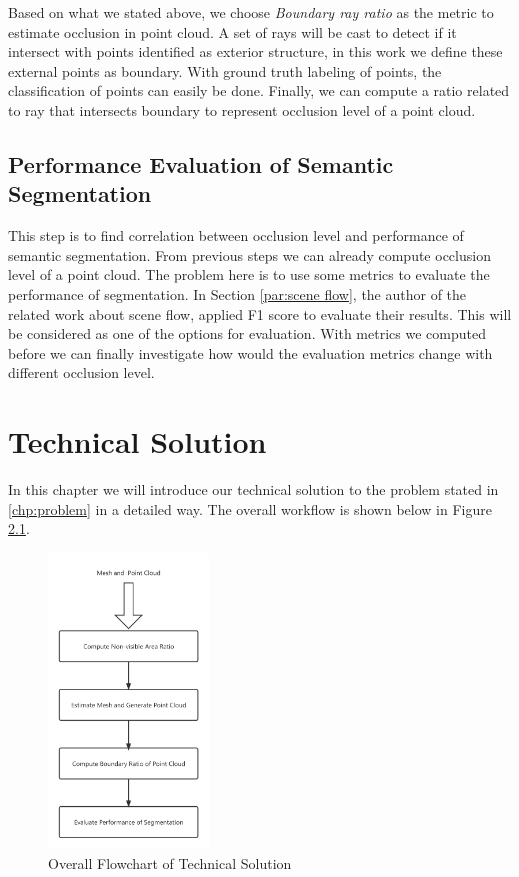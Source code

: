 \documentclass[11pt, a4paper,oneside,chapterprefix=false]{scrbook}
\begin{document}
Based on what we stated above, we choose \textit{Boundary ray ratio} as the metric to estimate occlusion in point cloud. A set of rays will be cast to detect if it intersect with points identified as exterior structure, in this work we define these external points as boundary. With ground truth labeling of points, the classification of points can easily be done. Finally, we can compute a ratio related to ray that intersects boundary to represent occlusion level of a point cloud. 

\section{Performance Evaluation of Semantic Segmentation} \label{sec:performance evaluation}

This step is to find correlation between occlusion level and performance of semantic segmentation. From previous steps we can already compute occlusion level of a point cloud. The problem here is to use some metrics to evaluate the performance of segmentation. In Section \ref{par:scene flow}, the author of the related work about scene flow, applied F1 score to evaluate their results. This will be considered as one of the options for evaluation. With metrics we computed before we can finally investigate how would the evaluation metrics change with different occlusion level. 

\chapter{Technical Solution} \label{chp:solution}

In this chapter we will introduce our technical solution to the problem stated in \ref{chp:problem} in a detailed way. The overall workflow is shown below in Figure \ref{fig:overall flowchart of technical solution}.

\begin{figure}[H]
    \centering
    \includegraphics*[width=0.38\textwidth]{figures/technical solution flowchart.png}
    \caption{Overall Flowchart of Technical Solution}
    \label{fig:overall flowchart of technical solution}
\end{figure}
\end{document}
